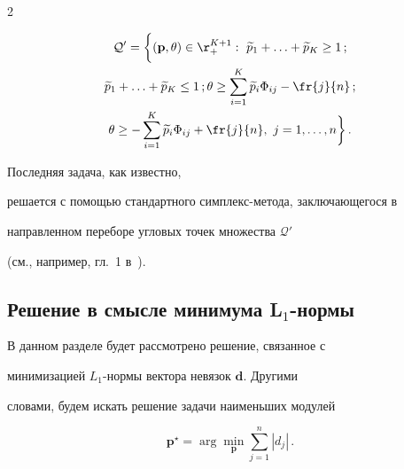 \begin{multicols}{2}
\begin{equation}
\end{equation}


\begin{multline}


{\mathcal


Q'}=\bigg\{({\mathbf p},{\mathbf \theta})\in\r_+^{K+1}:\


\widetilde p_1+\ldots+\widetilde p_K\ge 1\,;\\


\widetilde p_1+\ldots+\widetilde p_K \le 1\,;


\theta\ge\sum_{i=1}^K


\widetilde p_i\Phi_{ij}-\fr{j}{n}\,;\\


\theta \ge-\sum_{i=1}^K


\widetilde p_i\Phi_{ij}+\fr{j}{n},\


j=1,\ldots,n\bigg\}\,. \label{e19k}


\end{multline}


Последняя задача, как известно,


решается с помощью стандартного симплекс-метода, заключающегося в


направленном переборе угловых точек множества ${\mathcal Q'}$


(см., например, гл.~1 в~\cite{7k}).





\subsection{Решение в смысле минимума L$_1$-нормы}










В данном разделе будет рассмотрено решение, связанное с


минимизацией $L_1$-нормы вектора невязок ${\mathbf d}$. Другими


словами, будем искать решение задачи наименьших модулей


\begin{equation}


{\mathbf p}^{\star}=\arg\min_{\mathbf p}\sum_{j=1}^n|d_j|\,.



\end{equation}
\end{multicols}
